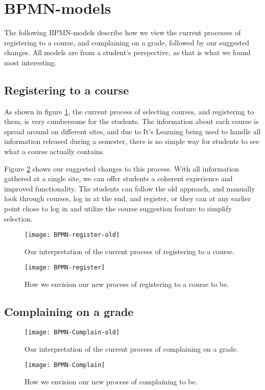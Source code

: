 \section{BPMN-models}
	The following BPMN-models\cite{bpmn} describe how we view the current processes of registering to a course, and complaining on a grade, followed by our suggested changes.
All models are from a student's perspective, as that is what we found most interesting.

\subsection{Registering to a course}
	As shown in figure \ref{fig:Register-old}, the current process of selecting courses, and registering to them, is very cumbersome for the students.
The information about each course is spread around on different sites, and due to It's Learning being used to handle all information released during a semester,
there is no simple way for students to see what a course actually contains.

Figure \ref{fig:Register-new} shows our suggested changes to this process.
With all information gathered at a single site, we can offer students a coherent experience and improved functionality.
The students can follow the old approach, and manually look through courses, log in at the end, and register,
or they can at any earlier point chose to log in and utilize the course suggestion feature to simplify selection.
\begin{figure}[H]
    \centering
    \texttt{[image: BPMN-register-old]}%
    \caption{Our interpretation of the current process of registering to a course.}
    \label{fig:Register-old}
\end{figure}

\begin{figure}[H]
    \centering
    \texttt{[image: BPMN-register]}
    \caption{How we envision our new process of registering to a course to be.}
    \label{fig:Register-new}
\end{figure}

\subsection{Complaining on a grade}
	

\begin{figure}[H]
    \centering
    \texttt{[image: BPMN-Complain-old]}
    \caption{Our interpretation of the current process of complaining on a grade.}
    \label{fig:Complain-old}
\end{figure}

\begin{figure}[H]
    \centering
    \texttt{[image: BPMN-Complain]}
    \caption{How we envision our new process of complaining to be.}
    \label{fig:Complain-new}
\end{figure}
